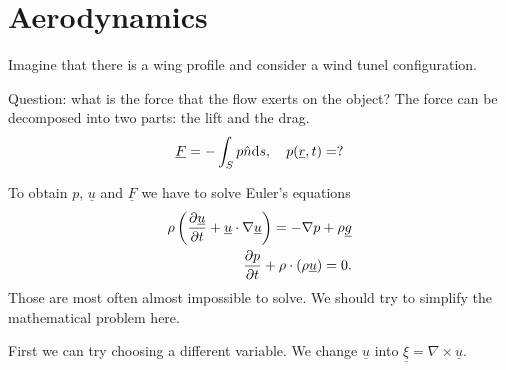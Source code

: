 \documentclass[11pt,oneside]{book}
\renewcommand{\vec}[1]{\underline{#1}}
\theoremstyle{definition} %
\theoremstyle{plain} %
\theoremstyle{remark} %
\theoremstyle{underline}
\begin{document}
  \section{Aerodynamics}

  Imagine that there is a wing profile and consider a wind tunel configuration.

  \begin{figure}[h]
    \centering
    \label{fig:}
  \end{figure}

  Question: what is the force that the flow exerts on the object?
  The force can be decomposed into two parts: the lift and the drag.
  \begin{displaymath}
    \vec F = -\int_S p \hat{n} \d s, \quad p(\vec r, t) = ?
  \end{displaymath}

  To obtain $p$, $\vec u$ and $\vec F$ we have to solve Euler's equations
  \begin{align*}
    \rho\left( \ptf{\vec u}{t} + \vec u \cdot \nabla \vec u \right) = - \nabla p + \rho \vec g\\
    \ptf{p}{t} + \rho \cdot (\rho \vec u) = 0.
  \end{align*}
  Those are most often almost impossible to solve.
  We should try to simplify the mathematical problem here.

  First we can try choosing a different variable.
  We change $\vec u$ into  $\vec \xi = \nabla \times \vec u$.
  
  \begin{figure}
    \centering
    \label{fig:}
  \end{figure}
\end{document}
